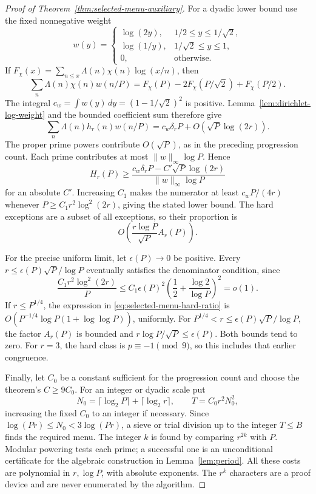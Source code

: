 \documentclass[11pt]{article}
\theoremstyle{definition}
\theoremstyle{remark}
\begin{document}
\begin{proof}[Proof of Theorem~\ref{thm:selected-menu-auxiliary}]
For a dyadic lower bound use the fixed nonnegative weight
\[
 w(y)=
 \begin{cases}
 \log(2y),&1/2\le y\le1/\sqrt2,\\
 \log(1/y),&1/\sqrt2\le y\le1,\\
 0,&\text{otherwise}.
 \end{cases}
\]
If \(F_\chi(x)=\sum_{n\le x}\Lambda(n)\chi(n)\log(x/n)\),
then
\[
 \sum_n\Lambda(n)\chi(n)w(n/P)
 =F_\chi(P)-2F_\chi(P/\sqrt2)+F_\chi(P/2).
\]
The integral \(c_w=\int w(y)\,dy=(1-1/\sqrt2)^2\) is positive.
Lemma~\ref{lem:dirichlet-log-weight} and the bounded coefficient
sum therefore give
\[
 \sum_n\Lambda(n)h_r(n)w(n/P)
 =c_w\delta_rP+O\!\left(\sqrt P\log(2r)\right).
\]
The proper prime powers contribute \(O(\sqrt P)\), as in the
preceding progression count. Each prime contributes at most
\(\|w\|_\infty\log P\). Hence
\[
 H_r(P)\ge
 \frac{c_w\delta_rP-C'\sqrt P\log(2r)}
      {\|w\|_\infty\log P}
\]
for an absolute \(C'\). Increasing \(C_1\) makes the numerator
at least \(c_wP/(4r)\) whenever
\(P\ge C_1r^2\log^2(2r)\), giving the stated lower bound.
The hard exceptions are a subset of all exceptions, so their
proportion is
\begin{equation}\label{eq:selected-menu-hard-ratio}
 O\!\left(\frac{r\log P}{\sqrt P}A_r(P)\right).
\end{equation}

For the precise uniform limit, let \(\epsilon(P)\to0\) be positive.
Every \(r\le\epsilon(P)\sqrt P/\log P\) eventually satisfies
the denominator condition, since
\[
 \frac{C_1r^2\log^2(2r)}{P}
 \le C_1\epsilon(P)^2
       \left(\frac12+\frac{\log2}{\log P}\right)^2=o(1).
\]
If \(r\le P^{1/4}\), the expression in
\eqref{eq:selected-menu-hard-ratio} is
\(O(P^{-1/4}\log P(1+\log\log P))\), uniformly.
For \(P^{1/4}<r\le\epsilon(P)\sqrt P/\log P\),
the factor \(A_r(P)\) is bounded and
\(r\log P/\sqrt P\le\epsilon(P)\).
Both bounds tend to zero. For \(r=3\), the hard class is
\(p\equiv-1\pmod9\), so this includes that earlier congruence.

Finally, let \(C_0\) be a constant sufficient for the progression
count and choose the theorem's \(C\ge9C_0\).
For an integer or dyadic scale put
\[
 N_0=\lceil\log_2P\rceil+\lceil\log_2r\rceil,\qquad
 T=C_0r^2N_0^2,
\]
increasing the fixed \(C_0\) to an integer if necessary.
Since \(\log(Pr)\le N_0<3\log(Pr)\), a sieve or trial division
up to the integer \(T\le B\) finds the required menu.
The integer \(k\) is found by comparing \(r^{2k}\) with \(P\).
Modular powering tests each prime; a successful one is an
unconditional certificate for the algebraic construction in
Lemma~\ref{lem:period}. All these costs are polynomial in
\(r,\log P\), with absolute exponents. The \(r^k\) characters
are a proof device and are never enumerated by the algorithm.
\end{proof}
\end{document}
